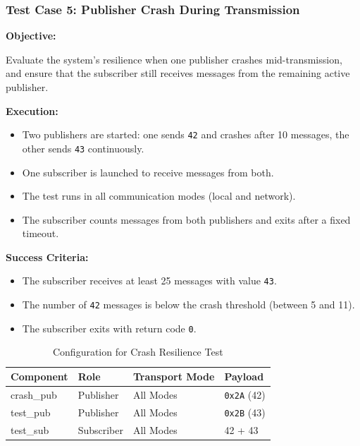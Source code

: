 \subsubsection{Test Case 5: Publisher Crash During Transmission}
\label{sec:tc5}

\textbf{Objective:} 

\vspace{0.4em}
Evaluate the system's resilience when one publisher crashes mid-transmission, and ensure that the subscriber still receives messages from the remaining active publisher.

\vspace{0.5em}
\textbf{Execution:}
\begin{itemize}
	\item Two publishers are started: one sends \texttt{42} and crashes after 10 messages, the other sends \texttt{43} continuously.
	\item One subscriber is launched to receive messages from both.
	\item The test runs in all communication modes (local and network).
	\item The subscriber counts messages from both publishers and exits after a fixed timeout.
\end{itemize}

\textbf{Success Criteria:}
\begin{itemize}
	\item The subscriber receives at least 25 messages with value \texttt{43}.
	\item The number of \texttt{42} messages is below the crash threshold (between 5 and 11).
	\item The subscriber exits with return code \texttt{0}.
\end{itemize}

\begin{table}[H]
	\centering
	\begin{tabular}{@{}llll@{}}
		\toprule
		\textbf{Component} & \textbf{Role}     & \textbf{Transport Mode} & \textbf{Payload} \\
		\midrule
		crash\_pub         & Publisher         & All Modes               & \texttt{0x2A} (42) \\
		test\_pub          & Publisher         & All Modes               & \texttt{0x2B} (43) \\
		test\_sub          & Subscriber        & All Modes               & 42 + 43 \\
		\bottomrule
	\end{tabular}
	\caption{Configuration for Crash Resilience Test}
	\label{tab:crash_resilience}
\end{table}

